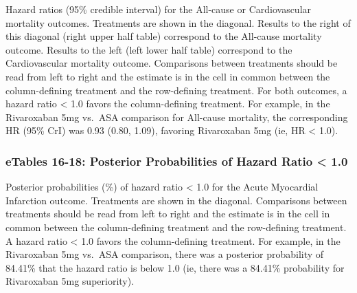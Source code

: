 \documentclass[
  12pt,
]{article}
\begin{document}
Hazard ratios (95\% credible interval) for the All-cause or
Cardiovascular mortality outcomes. Treatments are shown in the diagonal.
Results to the right of this diagonal (right upper half table)
correspond to the All-cause mortality outcome. Results to the left (left
lower half table) correspond to the Cardiovascular mortality outcome.
Comparisons between treatments should be read from left to right and the
estimate is in the cell in common between the column-defining treatment
and the row-defining treatment. For both outcomes, a hazard ratio
\textless{} 1.0 favors the column-defining treatment. For example, in
the Rivaroxaban 5mg vs.~ASA comparison for All-cause mortality, the
corresponding HR (95\% CrI) was 0.93 (0.80, 1.09), favoring Rivaroxaban
5mg (ie, HR \textless{} 1.0).

\newpage

\begin{landscape}

\hypertarget{etables-16-18-posterior-probabilities-of-hazard-ratio-1.0}{%
\subsubsection{eTables 16-18: Posterior Probabilities of Hazard Ratio
\textless{}
1.0}\label{etables-16-18-posterior-probabilities-of-hazard-ratio-1.0}}

\begin{table}[!h]

\caption{\label{tab:unnamed-chunk-38}Acute Myocardial Infarction}
\centering
{}
\end{table}

Posterior probabilities (\%) of hazard ratio \textless{} 1.0 for the
Acute Myocardial Infarction outcome. Treatments are shown in the
diagonal. Comparisons between treatments should be read from left to
right and the estimate is in the cell in common between the
column-defining treatment and the row-defining treatment. A hazard ratio
\textless{} 1.0 favors the column-defining treatment. For example, in
the Rivaroxaban 5mg vs.~ASA comparison, there was a posterior
probability of 84.41\% that the hazard ratio is below 1.0 (ie, there was
a 84.41\% probability for Rivaroxaban 5mg superiority).

\end{landscape}
\end{document}
